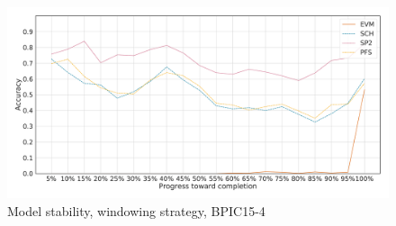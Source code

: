 \begin{figure}[!htb]
    \centering
    \includegraphics[width=\textwidth]{gfx/bpic2015_4/windowed_stability.pdf}
    \caption{Model stability, windowing strategy, BPIC15-4}
    \label{fig:bpic15-4-windowed-stability}
\end{figure}

\FloatBarrier
